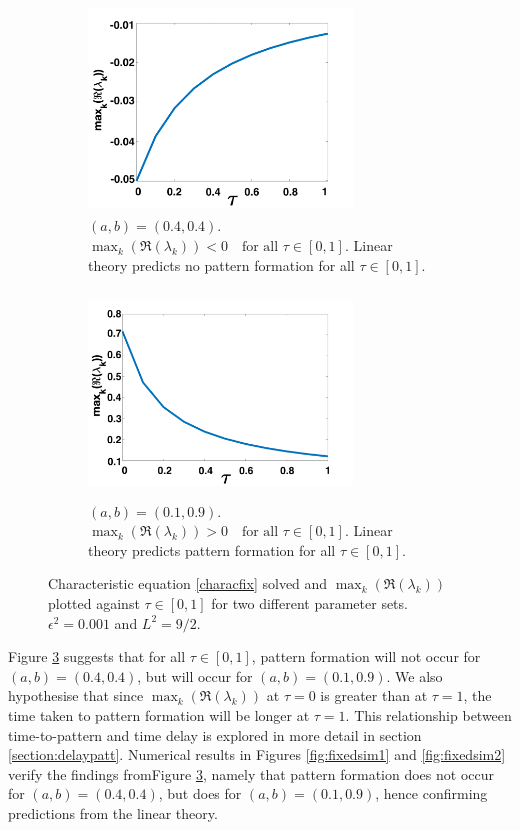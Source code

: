 \begin{figure}[H]
    \centering
    \begin{subfigure}[t]{0.45\textwidth}
        \centering
        \includegraphics[width=7cm,height = 5.5cm]{disp1.png}
        \caption{$(a,b)=(0.4,0.4)$. $\max_k(\Re(\lambda_k))<0 \quad \text{for all }\tau\in[0,1]$. Linear theory predicts no pattern formation for all $\tau\in[0,1]$. }
        \label{}
    \end{subfigure}
    \hfill
    \begin{subfigure}[t]{0.45\textwidth}
        \centering
        \includegraphics[width=7cm,height = 5.5cm]{disp2.png}
        \caption{$(a,b)=(0.1,0.9)$. $\max_k(\Re(\lambda_k))>0 \quad \text{for all }\tau\in[0,1]$. Linear theory predicts pattern formation for all $\tau\in[0, 1]$.}
        \label{}
    \end{subfigure}
    \caption{Characteristic equation \eqref{characfix} solved and $\max_k(\Re(\lambda_k))$ plotted against $\tau\in[0,1]$ for two different parameter sets. $\epsilon^2=0.001$ and $L^2=9/2$.}
    \label{fig:dispfixed}
\end{figure}
Figure \ref{fig:dispfixed} suggests that for all $\tau\in[0,1]$, pattern formation will not occur for $(a,b)=(0.4,0.4)$, but will occur for $(a,b)=(0.1,0.9)$. We also hypothesise that since $\max_k(\Re(\lambda_k))$ at $\tau=0$ is greater than at $\tau=1$, the time taken to pattern formation will be longer at $\tau=1$. This relationship between time-to-pattern and time delay is explored in more detail in section \ref{section:delaypatt}. Numerical results in Figures \ref{fig:fixedsim1} and \ref{fig:fixedsim2} verify the findings fromFigure \ref{fig:dispfixed}, namely that pattern formation does not occur for $(a,b)=(0.4,0.4)$, but does for $(a,b)=(0.1,0.9)$, hence confirming predictions from the linear theory.

